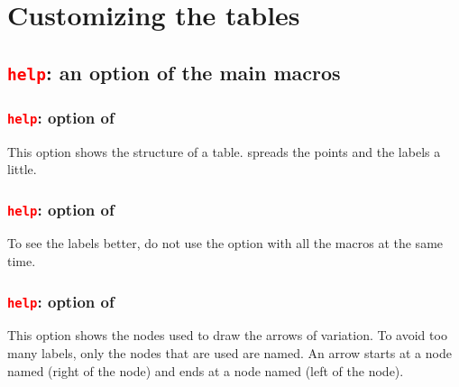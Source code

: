 \section{Customizing the tables}\label{pers}

\subsection{\texttt{\textcolor{red}{help}}: an option of the main macros}

\subsubsection{\texttt{\textcolor{red}{help}}: option of }
This option shows the structure of a table.  spreads the points and the labels a little.

\begin{tkzexample}[small]
\end{tkzexample}


\subsubsection{\texttt{\textcolor{red}{help}}: option of }
To see the labels better, do not use the option  with all the macros at the same time.
\begin{tkzexample}[small]
\end{tkzexample}

\subsubsection{\texttt{\textcolor{red}{help}}: option of }
This option shows the nodes used to draw the arrows of variation. To avoid too many labels, only the nodes that are used are named. An arrow starts at a node named  (right of the node) and ends at a node named  (left of the node).
\begin{tkzexample}[small]
\end{tkzexample}

